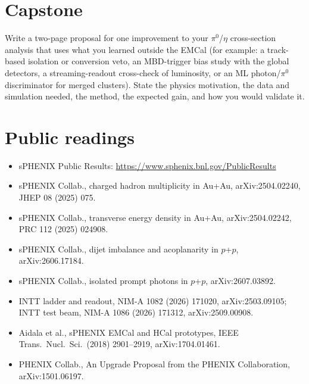 \documentclass[11pt,letterpaper]{article}
\begin{document}
\section{Capstone}
Write a two-page proposal for one improvement to your $\pi^0$/$\eta$ cross-section analysis that uses what you learned outside the EMCal
(for example: a track-based isolation or conversion veto, an MBD-trigger bias study with the global detectors, a streaming-readout
cross-check of luminosity, or an ML photon/$\pi^0$ discriminator for merged clusters). State the physics motivation, the data and
simulation needed, the method, the expected gain, and how you would validate it.
\section{Public readings}
\begin{itemize}
\item sPHENIX Public Results: \url{https://www.sphenix.bnl.gov/PublicResults}
\item sPHENIX Collab., charged hadron multiplicity in Au+Au, arXiv:2504.02240, JHEP 08 (2025) 075.
\item sPHENIX Collab., transverse energy density in Au+Au, arXiv:2504.02242, PRC 112 (2025) 024908.
\item sPHENIX Collab., dijet imbalance and acoplanarity in $p$+$p$, arXiv:2606.17184.
\item sPHENIX Collab., isolated prompt photons in $p$+$p$, arXiv:2607.03892.
\item INTT ladder and readout, NIM-A 1082 (2026) 171020, arXiv:2503.09105; INTT test beam, NIM-A 1086 (2026) 171312, arXiv:2509.00908.
\item Aidala et al., sPHENIX EMCal and HCal prototypes, IEEE Trans.\ Nucl.\ Sci.\ (2018) 2901--2919, arXiv:1704.01461.
\item PHENIX Collab., An Upgrade Proposal from the PHENIX Collaboration, arXiv:1501.06197.
\end{itemize}
\end{document}
